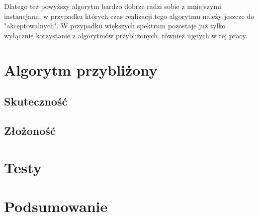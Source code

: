 \documentclass{article}
\begin{document}
Dlatego też powyższy algorytm bardzo dobrze radzi sobie z mniejszymi instancjami, w przypadku których czas realizacji tego algorytmu należy jeszcze do "akceptowalnych". W przypadku większych spektrum pozostaje już tylko wyłącznie korzystanie z algorytmów przybliżonych, również ujętych w tej pracy.


\section{Algorytm przybliżony}

\subsection{Skuteczność}

\subsection{Złożoność}

\section{Testy}

\section{Podsumowanie}
\end{document}
